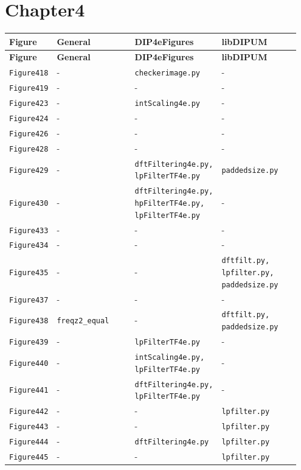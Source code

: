 \documentclass[10pt]{article}
\begin{document}
\section*{Chapter4}
\setlength{\tabcolsep}{4pt}
\begin{longtable}{p{0.11\linewidth} p{0.28\linewidth} p{0.28\linewidth} p{0.28\linewidth}}
\toprule
\textbf{Figure} & \textbf{General} & \textbf{DIP4eFigures} & \textbf{libDIPUM} \\
\midrule
\endfirsthead
\toprule
\textbf{Figure} & \textbf{General} & \textbf{DIP4eFigures} & \textbf{libDIPUM} \\
\midrule
\endhead
\bottomrule
\endfoot
\texttt{Figure418} & - & \texttt{checkerimage.py} & - \\
\texttt{Figure419} & - & - & - \\
\texttt{Figure423} & - & \texttt{intScaling4e.py} & - \\
\texttt{Figure424} & - & - & - \\
\texttt{Figure426} & - & - & - \\
\texttt{Figure428} & - & - & - \\
\texttt{Figure429} & - & \texttt{dftFiltering4e.py, lpFilterTF4e.py} & \texttt{paddedsize.py} \\
\texttt{Figure430} & - & \texttt{dftFiltering4e.py, hpFilterTF4e.py, lpFilterTF4e.py} & - \\
\texttt{Figure433} & - & - & - \\
\texttt{Figure434} & - & - & - \\
\texttt{Figure435} & - & - & \texttt{dftfilt.py, lpfilter.py, paddedsize.py} \\
\texttt{Figure437} & - & - & - \\
\texttt{Figure438} & \texttt{freqz2\_equal} & - & \texttt{dftfilt.py, paddedsize.py} \\
\texttt{Figure439} & - & \texttt{lpFilterTF4e.py} & - \\
\texttt{Figure440} & - & \texttt{intScaling4e.py, lpFilterTF4e.py} & - \\
\texttt{Figure441} & - & \texttt{dftFiltering4e.py, lpFilterTF4e.py} & - \\
\texttt{Figure442} & - & - & \texttt{lpfilter.py} \\
\texttt{Figure443} & - & - & \texttt{lpfilter.py} \\
\texttt{Figure444} & - & \texttt{dftFiltering4e.py} & \texttt{lpfilter.py} \\
\texttt{Figure445} & - & - & \texttt{lpfilter.py} \\

\end{longtable}
\end{document}
